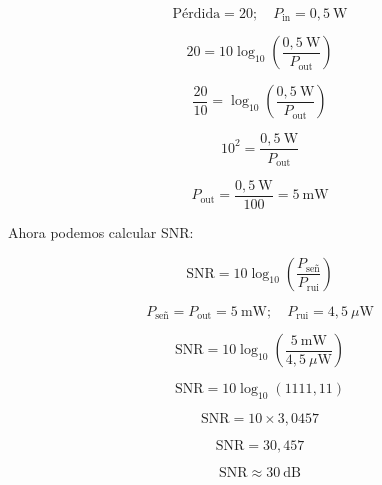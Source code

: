 \documentclass[11pt,a4paper]{article}
\begin{document}
\begin{enumerate}[label=4.\arabic*), itemsep=0.3cm]
        \[
          \text{Pérdida} = 20; \quad P_{\text{in}} = 0,5\ \text{W}
        \]

        \[
          20 = 10 \log_{10}\left(\frac{0,5\ \text{W}}{P_{\text{out}}}\right)
        \]

        \[
          \frac{20}{10} = \log_{10}\left(\frac{0,5\ \text{W}}{P_{\text{out}}}\right)
        \]

        \[
          10^{2} = \frac{0,5\ \text{W}}{P_{\text{out}}}
        \]

        \[
          P_{\text{out}} = \frac{0,5\ \text{W}}{100} = 5\ \text{mW}
        \]

        Ahora podemos calcular SNR:

        \[
          \text{SNR} = 10 \log_{10}\left(\frac{P_{\text{señ}}}{P_{\text{rui}}}\right)
        \]

        \[
          P_{\text{señ}} = P_{\text{out}} = 5\ \text{mW}; \quad P_{\text{rui}} = 4,5\ \mu\text{W}
        \]

        \[
          \text{SNR} = 10 \log_{10}\left(\frac{5\ \text{mW}}{4,5\ \mu\text{W}}\right)
        \]

        \[
          \text{SNR} = 10 \log_{10}(1111,11)
        \]

        \[
          \text{SNR} = 10 \times 3,0457
        \]

        \[
          \text{SNR} = 30,457
        \]

        \[
          \boxed{\text{SNR} \approx 30\ \text{dB}}
        \]


\end{enumerate}
\end{document}

